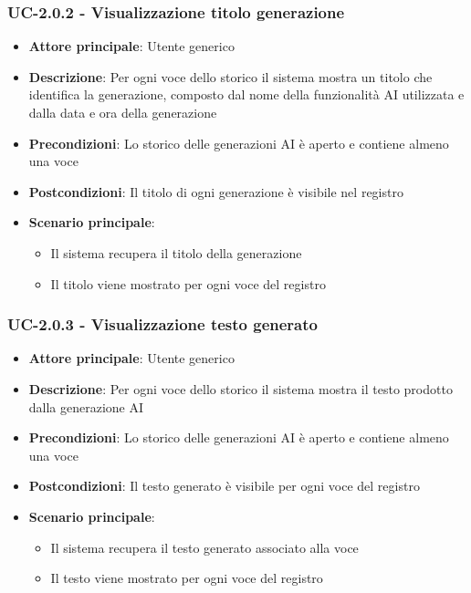 \documentclass[11pt,a4paper]{article}
\begin{document}
\subsubsection{UC-2.0.2 - Visualizzazione titolo generazione}
\begin{itemize}
    \item \textbf{Attore principale}: Utente generico
    \item \textbf{Descrizione}: Per ogni voce dello storico il sistema mostra un titolo che identifica la generazione, composto dal 
    nome della funzionalità AI utilizzata e dalla data e ora della generazione
    \item \textbf{Precondizioni}: Lo storico delle generazioni AI è aperto e contiene almeno una voce
    \item \textbf{Postcondizioni}: Il titolo di ogni generazione è visibile nel registro
    \item \textbf{Scenario principale}:
        \begin{itemize}
            \item Il sistema recupera il titolo della generazione 
            \item Il titolo viene mostrato per ogni voce del registro
        \end{itemize}
\end{itemize}

\subsubsection{UC-2.0.3 - Visualizzazione testo generato}
\begin{itemize}
    \item \textbf{Attore principale}: Utente generico
    \item \textbf{Descrizione}: Per ogni voce dello storico il sistema mostra il testo prodotto dalla generazione AI
    \item \textbf{Precondizioni}: Lo storico delle generazioni AI è aperto e contiene almeno una voce
    \item \textbf{Postcondizioni}: Il testo generato è visibile per ogni voce del registro
    \item \textbf{Scenario principale}:
        \begin{itemize}
            \item Il sistema recupera il testo generato associato alla voce
            \item Il testo viene mostrato per ogni voce del registro
        \end{itemize}
\end{itemize}
\end{document}

